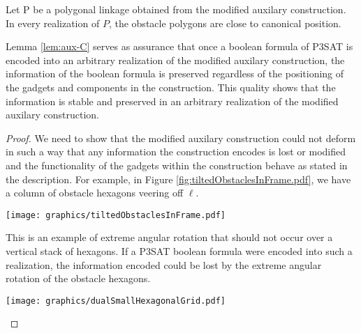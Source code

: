 \begin{lem}\label{lem:aux-C}
Let P be a polygonal linkage obtained from the modified auxilary construction.  
In every realization of $P$, the obstacle polygons are close to canonical position.
\end{lem}

Lemma \ref{lem:aux-C} serves as assurance that once a boolean formula of P3SAT is encoded into an arbitrary realization of the modified auxilary construction, the information of the boolean formula is preserved regardless of the positioning of the gadgets and components in the construction.
This quality shows that the information is stable and preserved in an arbitrary realization of the modified auxilary construction.

\begin{proof}
We need to show that the modified auxilary construction could not deform in such a way that any information the construction encodes is lost or modified and the functionality of the gadgets within the construction behave as stated in the description. 
For example, in Figure \ref{fig:tiltedObstaclesInFrame.pdf}, we have a column of obstacle hexagons veering off $\ell$.

\begin{minipage}{\linewidth}
\begin{center}
\texttt{[image: graphics/tiltedObstaclesInFrame.pdf]}
\label{fig:tiltedObstaclesInFrame.pdf}
\end{center}
\end{minipage}

This is an example of extreme angular rotation that should not occur over a vertical stack of hexagons. 
If a P3SAT boolean formula were encoded into such a realization, the information encoded could be lost by the extreme angular rotation of the obstacle hexagons.

\begin{minipage}{\linewidth}
\begin{center}
\texttt{[image: graphics/dualSmallHexagonalGrid.pdf]}
\label{fig:dualSmallHexagonalGrid.pdf}
\end{center}
\end{minipage}


\end{proof}
